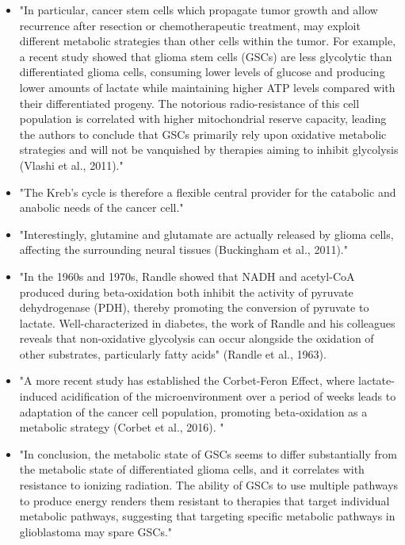 \documentclass[11pt,a4paper]{article}
\begin{document}
\begin{itemize}
\item "In particular, cancer stem cells which propagate tumor growth and allow recurrence after resection or chemotherapeutic treatment, may exploit different metabolic strategies than other cells within the tumor. For example, a recent study showed that glioma stem cells (GSCs) are less glycolytic than differentiated glioma cells, consuming lower levels of glucose and producing lower amounts of lactate while maintaining higher ATP levels compared with their differentiated progeny. The notorious radio-resistance of this cell population is correlated with higher mitochondrial reserve capacity, leading the authors to conclude that GSCs primarily rely upon oxidative metabolic strategies and will not be vanquished by therapies aiming to inhibit glycolysis (Vlashi et al., 2011)."\cite{Strickland2017}

\item "The Kreb's cycle is therefore a flexible central provider for the catabolic and anabolic needs of the cancer cell." \cite{Strickland2017}

\item "Interestingly, glutamine and glutamate are actually released by glioma cells, affecting the surrounding neural tissues (Buckingham et al., 2011)."\cite{Strickland2017}

\item "In the 1960s and 1970s, Randle showed that NADH and acetyl-CoA produced during beta-oxidation both inhibit the activity of pyruvate dehydrogenase (PDH), thereby promoting the conversion of pyruvate to lactate. Well-characterized in diabetes, the work of Randle and his colleagues reveals that non-oxidative glycolysis can occur alongside the oxidation of other substrates, particularly fatty acids" (Randle et al., 1963).\cite{Strickland2017}

\item "A more recent study has established the Corbet-Feron Effect, where lactate-induced acidification of the microenvironment over a period of weeks leads to adaptation of the cancer cell population, promoting beta-oxidation as a metabolic strategy (Corbet et al., 2016). "\cite{Strickland2017}

\item "In conclusion, the metabolic state of GSCs seems to differ substantially from the metabolic state of differentiated glioma cells, and it correlates with resistance to ionizing radiation. The ability of GSCs to use multiple pathways to produce energy renders them resistant to therapies that target individual metabolic pathways, suggesting that targeting specific metabolic pathways in glioblastoma may spare GSCs."\cite{Vlashi2011}


\end{itemize}
\end{document}
